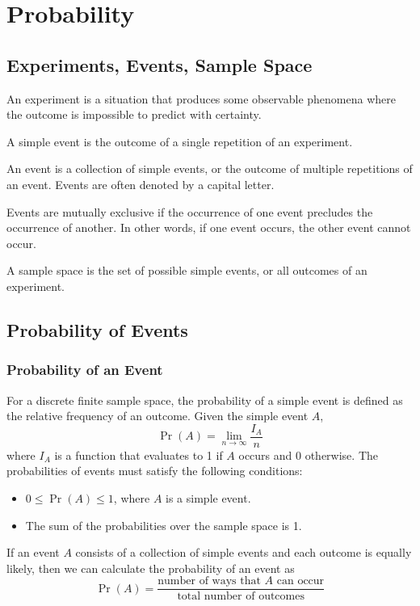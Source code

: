 \documentclass{article}
\begin{document}
\section{Probability}
\subsection{Experiments, Events, Sample Space}
\begin{definition}[Experiment]
    An experiment is a situation that produces some observable phenomena
    where the outcome is impossible to predict with certainty.
\end{definition}
\begin{definition}
    A simple event is the outcome of a single repetition of an experiment.
\end{definition}
\begin{definition}[Event]
    An event is a collection of simple events, or the outcome of
    multiple repetitions of an event. Events are often denoted by a
    capital letter.
\end{definition}
\begin{definition}
    Events are mutually exclusive if the occurrence of one event
    precludes the occurrence of another. In other words, if one event
    occurs, the other event cannot occur.
\end{definition}
\begin{definition}
    A sample space is the set of possible simple events, or all outcomes
    of an experiment.
\end{definition}
\subsection{Probability of Events}
\subsubsection{Probability of an Event}
For a discrete finite sample space, the probability of a simple event
is defined as the relative frequency of an outcome. Given the simple
event \(A\),
\begin{equation*}
    \Pr{\left( A \right)} = \lim_{n \to \infty} \frac{I_A}{n}
\end{equation*}
where \(I_A\) is a function that evaluates to 1 if \(A\) occurs and 0
otherwise. The probabilities of events must satisfy the following
conditions:
\begin{itemize}
    \item \(0 \leq \Pr{\left( A \right)} \leq 1\), where \(A\) is a simple event.
    \item The sum of the probabilities over the sample space is 1.
\end{itemize}
If an event \(A\) consists of a collection of simple events and each
outcome is equally likely, then we can calculate the probability of an
event as
\begin{equation*}
    \Pr{\left( A \right)} = \frac{\text{number of ways that \(A\) can occur}}{\text{total number of outcomes}}
\end{equation*}
\end{document}
